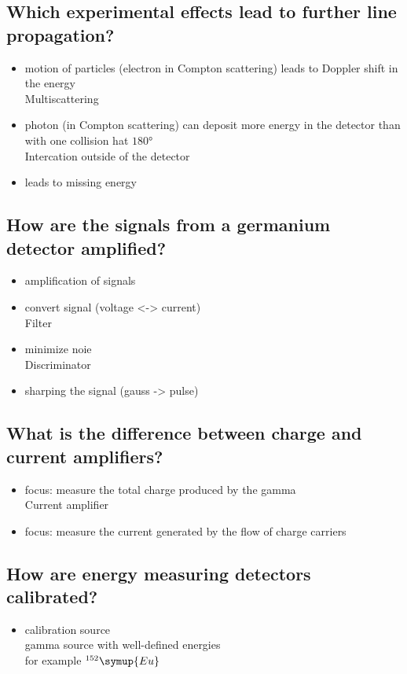 \subsection*{Which experimental effects lead to further line 
propagation?}
\begin{itemize}
    Doppler Broadening
    \item motion of particles (electron in Compton scattering) leads to Doppler shift in the energy 
    \\
    Multiscattering
    \item photon (in Compton scattering) can deposit more energy in the detector than with one collision hat $180°$  
    \\
    Intercation outside of the detector
    \item leads to missing energy
\end{itemize}

\subsection*{How are the signals from a germanium detector amplified?}
\begin{itemize}
    Preamplification
    \item amplification of signals
    \item convert signal (voltage <-> current)
    \\
    Filter
    \item minimize noie 
    \\
    Discriminator
    \item sharping the signal (gauss -> pulse)
\end{itemize}
\subsection*{What is the difference between charge and current 
amplifiers?}
\begin{itemize}
    Charge amplifier
    \item focus: measure the total charge produced by the gamma 
    \\
    Current amplifier
    \item focus: measure the current generated by the flow of charge carriers 
\end{itemize}

\subsection*{How are energy measuring detectors calibrated?}
\begin{itemize}
    \item calibration source \\
    \to gamma source with well-defined energies \\
    \to for example  $^{152}\symup{Eu}$
\end{itemize}

